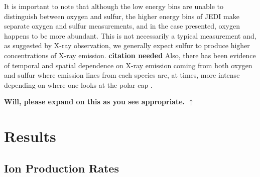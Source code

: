 \documentclass[draft]{agujournal2018}
\begin{document}
It is important to note that although the low energy bins are unable to distinguish between oxygen and sulfur, the higher energy bins of JEDI make separate oxygen and sulfur measurements, and in the case presented, oxygen happens to be more abundant.
This is not necessarily a typical measurement and, as suggested by X-ray observation, we generally expect sulfur to produce higher concentrations of X-ray emission. \textbf{citation needed}
Also, there has been evidence of temporal and spatial dependence on X-ray emission coming from both oxygen and sulfur where emission lines from each species are, at times, more intense depending on where one looks at the polar cap \citep{dunn2017,gladstone2002,jackman2018}.


\noindent\textbf{\Large Will, please expand on this as you see appropriate. $\uparrow$}

\section{Results}

\subsection{Ion Production Rates}
\end{document}

